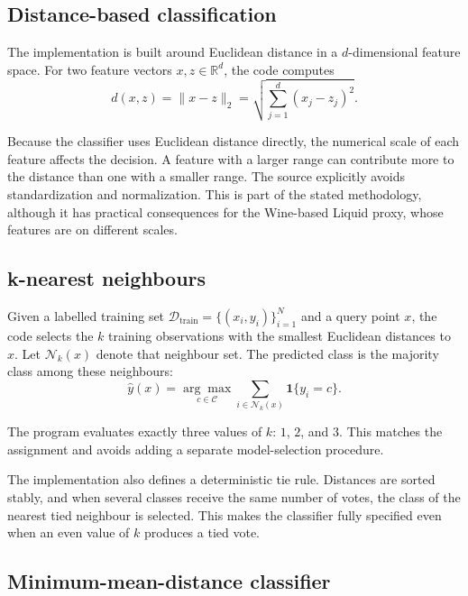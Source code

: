 \documentclass[11pt,a4paper]{article}
\begin{document}
\subsection{Distance-based classification}

The implementation is built around Euclidean distance in a $d$-dimensional feature space. For two feature vectors $x,z\in\mathbb{R}^d$, the code computes
\begin{equation}
 d(x,z)=\lVert x-z\rVert_2
 =\sqrt{\sum_{j=1}^{d}(x_j-z_j)^2}.
\end{equation}

Because the classifier uses Euclidean distance directly, the numerical scale of each feature affects the decision. A feature with a larger range can contribute more to the distance than one with a smaller range. The source explicitly avoids standardization and normalization. This is part of the stated methodology, although it has practical consequences for the Wine-based Liquid proxy, whose features are on different scales.

\subsection{k-nearest neighbours}

Given a labelled training set $\mathcal{D}_{\mathrm{train}}=\{(x_i,y_i)\}_{i=1}^N$ and a query point $x$, the code selects the $k$ training observations with the smallest Euclidean distances to $x$. Let $\mathcal{N}_k(x)$ denote that neighbour set. The predicted class is the majority class among these neighbours:
\begin{equation}
 \hat{y}(x)
 =
 \underset{c\in\mathcal{C}}{\arg\max}
 \sum_{i\in\mathcal{N}_k(x)}\mathbf{1}\{y_i=c\}.
\end{equation}

The program evaluates exactly three values of $k$: $1$, $2$, and $3$. This matches the assignment and avoids adding a separate model-selection procedure.

The implementation also defines a deterministic tie rule. Distances are sorted stably, and when several classes receive the same number of votes, the class of the nearest tied neighbour is selected. This makes the classifier fully specified even when an even value of $k$ produces a tied vote.

\subsection{Minimum-mean-distance classifier}
\end{document}

